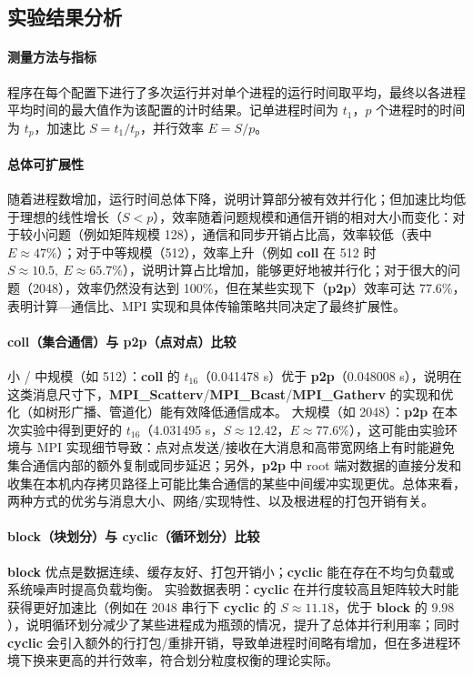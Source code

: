 \documentclass{SYSUReport}
\begin{document}
\subsection{实验结果分析}

\paragraph{测量方法与指标}
程序在每个配置下进行了多次运行并对单个进程的运行时间取平均，最终以各进程平均时间的最大值作为该配置的计时结果。记单进程时间为 $t_1$，$p$ 个进程时的时间为 $t_p$，加速比 $S = t_1 / t_p$，并行效率 $E = S / p$。

\paragraph{总体可扩展性}
随着进程数增加，运行时间总体下降，说明计算部分被有效并行化；但加速比均低于理想的线性增长（$S<p$），效率随着问题规模和通信开销的相对大小而变化：对于较小问题（例如矩阵规模 128），通信和同步开销占比高，效率较低（表中 $E\approx 47\%$）；对于中等规模（512），效率上升（例如 \textbf{coll} 在 512 时 $S\approx 10.5,\ E\approx 65.7\%$），说明计算占比增加，能够更好地被并行化；对于很大的问题（2048），效率仍然没有达到 100\%，但在某些实现下（\textbf{p2p}）效率可达 77.6\%，表明计算—通信比、MPI 实现和具体传输策略共同决定了最终扩展性。

\paragraph{\textbf{coll}（集合通信）与 \textbf{p2p}（点对点）比较}
小 / 中规模（如 512）：\textbf{coll} 的 $t_{16}$（0.041478 s）优于 \textbf{p2p}（0.048008 s），说明在这类消息尺寸下，\textbf{MPI\_Scatterv}/\textbf{MPI\_Bcast}/\textbf{MPI\_Gatherv} 的实现和优化（如树形广播、管道化）能有效降低通信成本。
大规模（如 2048）：\textbf{p2p} 在本次实验中得到更好的 $t_{16}$（4.031495 s，$S\approx 12.42$，$E\approx 77.6\%$），这可能由实验环境与 MPI 实现细节导致：点对点发送/接收在大消息和高带宽网络上有时能避免集合通信内部的额外复制或同步延迟；另外，\textbf{p2p} 中 root 端对数据的直接分发和收集在本机内存拷贝路径上可能比集合通信的某些中间缓冲实现更优。总体来看，两种方式的优劣与消息大小、网络/实现特性、以及根进程的打包开销有关。

\paragraph{\textbf{block}（块划分）与 \textbf{cyclic}（循环划分）比较}
\textbf{block} 优点是数据连续、缓存友好、打包开销小；\textbf{cyclic} 能在存在不均匀负载或系统噪声时提高负载均衡。
实验数据表明：\textbf{cyclic} 在并行度较高且矩阵较大时能获得更好加速比（例如在 2048 串行下 \textbf{cyclic} 的 $S\approx 11.18$，优于 \textbf{block} 的 $9.98$），说明循环划分减少了某些进程成为瓶颈的情况，提升了总体并行利用率；同时 \textbf{cyclic} 会引入额外的行打包/重排开销，导致单进程时间略有增加，但在多进程环境下换来更高的并行效率，符合划分粒度权衡的理论实际。
\end{document}

